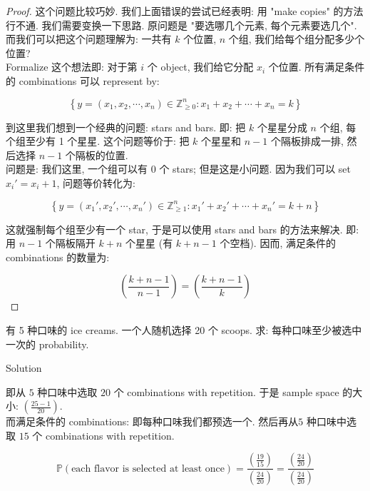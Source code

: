 \documentclass{qlnotes-export}
\begin{document}
\begin{proof}

这个问题比较巧妙. 我们上面错误的尝试已经表明: 用 "make copies" 的方法行不通. 我们需要变换一下思路. 原问题是 "要选哪几个元素, 每个元素要选几个". 而我们可以把这个问题理解为: 一共有 \(k\) 个位置, \(n\) 个组, 我们给每个组分配多少个位置?\\
Formalize 这个想法即: 对于第 \(i\) 个 object, 我们给它分配 \(x_{i}\) 个位置. 所有满足条件的 combinations 可以 represent by:

\[\left\{ {y = (x_{1},x_{2},\cdots,x_{n}) \in {\mathbb{Z}}_{\geq 0}^{n}:x_{1} + x_{2} + \cdots + x_{n} = k} \right\}\]

到这里我们想到一个经典的问题: stars and bars. 即: 把 \(k\) 个星星分成 \(n\) 个组, 每个组至少有 1 个星星. 这个问题等价于: 把 \(k\) 个星星和 \(n - 1\) 个隔板排成一排, 然后选择 \(n - 1\) 个隔板的位置.\\
问题是: 我们这里, 一个组可以有 \(0\) 个 stars; 但是这是小问题. 因为我们可以 set \(x_{i}' = x_{i} + 1\), 问题等价转化为:

\[\left\{ {y = (x_{1}',x_{2}',\cdots,x_{n}') \in {\mathbb{Z}}_{\geq 1}^{n}:x_{1}' + x_{2}' + \cdots + x_{n}' = k + n} \right\}\]

这就强制每个组至少有一个 star, 于是可以使用 stars and bars 的方法来解决. 即: 用 \(n - 1\) 个隔板隔开 \(k + n\) 个星星 (有 \(k + n - 1\) 个空档). 因而, 满足条件的 combinations 的数量为:

\[\left( \frac{k + n - 1}{n - 1} \right) = \left( \frac{k + n - 1}{k} \right)\]

\end{proof}

\begin{example}

有 5 种口味的 ice creams. 一个人随机选择 20 个 scoops. 求: 每种口味至少被选中一次的 probability.

\end{example}

\begin{qlsolution}{Solution}

即从 \(5\) 种口味中选取 \(20\) 个 combinations with repetition. 于是 sample space 的大小: \(\left( \frac{25 - 1}{20} \right)\).\\
而满足条件的 combinations: 即每种口味我们都预选一个. 然后再从\(5\) 种口味中选取 \(15\) 个 combinations with repetition.

\[{\mathbb{P}}(\text{each flavor is selected at least once}) = \frac{\left( \frac{19}{15} \right)}{\left( \frac{24}{20} \right)} = \frac{\left( \frac{24}{20} \right)}{\left( \frac{24}{20} \right)}\]

\end{qlsolution}
\end{document}
